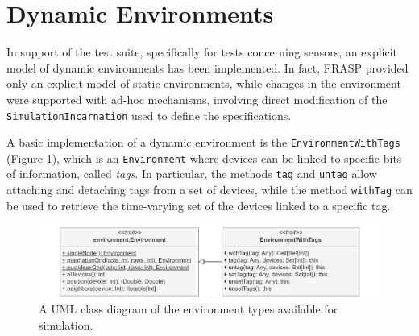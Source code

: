 
\section{Dynamic Environments}
\label{section:implementation:dynamic-environments}

In support of the test suite, specifically for tests concerning sensors, an
explicit model of dynamic environments has been implemented. In fact, FRASP
provided only an explicit model of static environments, while changes in the
environment were supported with ad-hoc mechanisms, involving direct
modification of the \texttt{SimulationIncarnation} used to define the
specifications.

A basic implementation of a dynamic environment is the
\texttt{EnvironmentWith\-Tags} (Figure \ref{figure:environment-class-diagram}),
which is an \texttt{Environment} where devices can be linked to specific bits
of information, called \textit{tags}. In particular, the methods \texttt{tag}
and \texttt{untag} allow attaching and detaching tags from a set of devices,
while the method \texttt{withTag} can be used to retrieve the time-varying set
of the devices linked to a specific tag.

\begin{figure}[!ht]
  \centering
  \includegraphics[width=1\textwidth]{resources/figures/diagrams/short/environment-class-diagram.pdf}
  \caption[A UML class diagram of the environments types in FRASP]{
    A UML class diagram of the environment types available
    for simulation.
  }
  \label{figure:environment-class-diagram}
\end{figure}

